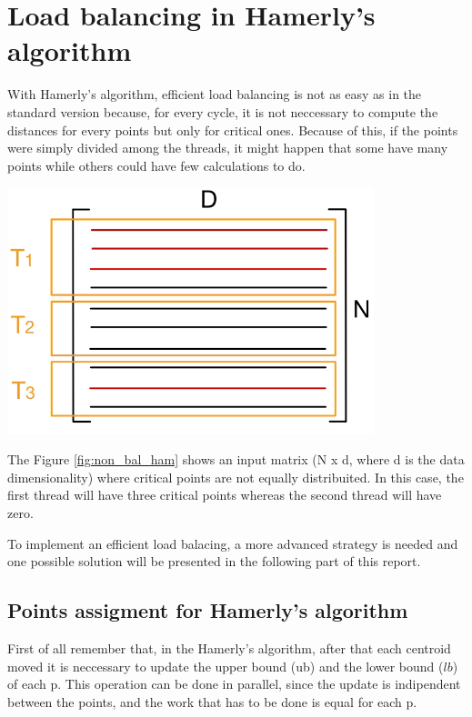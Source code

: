 \documentclass{report}
\begin{document}
\begin{minipage}[b]{0.48\textwidth}
    \section*{Load balancing in Hamerly's algorithm}
    With Hamerly's algorithm, efficient load balancing is not as easy as in the standard version because, for every cycle, it is not neccessary to compute the distances for every points but only for critical ones. Because of this, if the points were simply divided among the threads, it might happen that some have many points while others could have few calculations to do.

    \begin{center}
      \includegraphics[width = 0.8\textwidth]{imgs/non_balances_hamerly.png}
      \label{fig:non_bal_ham}
    \end{center}

    The Figure \ref{fig:non_bal_ham} shows an input matrix (N x d, where d is the data dimensionality) where critical points are not  equally distribuited. In this case, the first thread will have three critical points whereas the second thread will have zero.

    To implement an efficient load balacing, a more advanced strategy is needed and one possible solution will be presented in the following part of this report. 
    
    \subsection*{Points assigment for Hamerly's algorithm}
    First of all remember that, in the Hamerly's algorithm, after that each centroid moved it is neccessary to update the upper bound (ub) and the lower bound ($lb$) of each p. This operation can be done in parallel, since the update is indipendent between the points, and the work that has to be done is equal for each p. 


\end{minipage}
\end{document}
